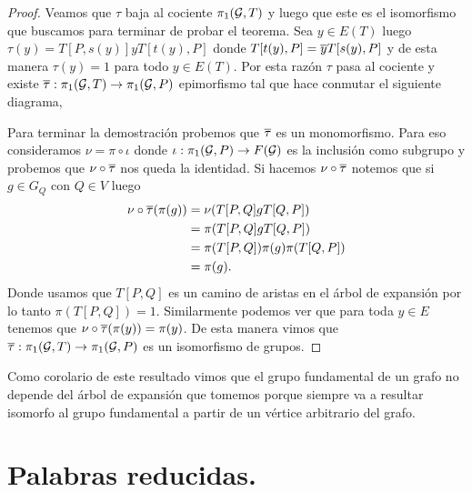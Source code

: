 \documentclass[tesis.tex]{subfiles}
\begin{document}
\begin{proof}
	Veamos que $\tau$ baja al cociente $\pi_1({\cal G}, T)$ y luego que este es el isomorfismo que buscamos para terminar de probar el teorema.
	Sea $y \in E(T)$ luego $\tau(y) = T[P,s(y)]yT[t(y), P]$ donde $T[t(y), P] = \overline y T[s(y), P]$ y de esta manera $\tau(y) = 1$ para todo $y \in E(T)$.
	Por esta razón $\tau$ pasa al cociente y existe $\overline \tau: \pi_{1}({\cal G}, T) \to \pi_1 ({\cal G}, P)$ epimorfismo tal que hace conmutar el siguiente diagrama,
	
	\begin{center}
	\end{center}
	
	Para terminar la demostración probemos que $\overline \tau$ es un monomorfismo.
	Para eso consideramos $\nu = \pi \circ \iota$ donde $\iota: \pi_1({\cal G},P) \to F({\cal G})$ es la inclusión como subgrupo y probemos que $\nu \circ \overline \tau$ nos queda la identidad.
	Si hacemos $\nu \circ \overline \tau$ notemos que si $g \in G_Q$ con $Q \in V$ luego
	\begin{align*}
		\nu \circ \overline \tau (\pi (g)) & = \nu (T[P,Q]gT[Q,P]) \\
					&= \pi(T[P,Q]gT[Q,P]) \\
					&= \pi(T[P,Q]) \pi (g) \pi (T[Q,P]) \\
					&= \pi(g).
	\end{align*}
	Donde usamos que $T[P,Q]$ es un camino de aristas en el árbol de expansión por lo tanto $\pi(T[P,Q]) = 1$. 
	Similarmente podemos ver que para toda $y \in E$ tenemos que $\nu \circ \overline \tau (\pi(y)) = \pi(y)$.
	De esta manera vimos que $\overline \tau : \pi_{1}({\cal G},T) \to \pi_{1}({\cal G},P)$ es un isomorfismo de grupos.
\end{proof}

Como corolario de este resultado vimos que el grupo fundamental de un grafo no depende del árbol de expansión que tomemos porque siempre va a resultar isomorfo al grupo fundamental a partir de un vértice arbitrario del grafo.

\section{Palabras reducidas.}
\end{document}
